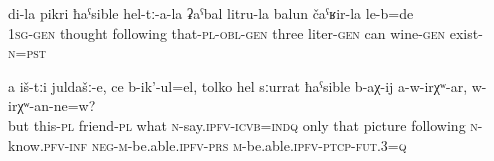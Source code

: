 \begin{exe}
	\ex
	\begin{xlist}
		\ex	\label{In my mind there was their 3-litre can with wine}
		\gll	di-la	pikri	ħaˁsible	hel-tː-a-la	ʡaˁbal	litru-la	balun	čaˁʁir-la le-b=de\\
			1\textsc{sg}-\textsc{gen}	thought	following	that-\textsc{pl}-\textsc{obl}-\textsc{gen}	three	liter-\textsc{gen} can	wine-\textsc{gen}	exist-\textsc{n}=\textsc{pst}\\
		\glt	{}

		\ex	\label{And these friends, what they are saying, only by means of the picture, (one) cannot know, can}
		\gll	a	iš-tːi	juldašː-e,	ce	b-ik'-ul=el,	tolko	hel	sːurrat	ħaˁsible	b-aχ-ij	a-w-irχʷ-ar,	w-irχʷ-an-ne=w?\\
			but	this-\textsc{pl}	friend-\textsc{pl}	what	\textsc{n}-say.\textsc{ipfv}-\textsc{icvb}=\textsc{indq}	only	that	picture	following	\textsc{n}-know.\textsc{pfv}-\textsc{inf}	\textsc{neg}-\textsc{m}-be.able.\textsc{ipfv}-\textsc{prs}	\textsc{m}-be.able.\textsc{ipfv}-\textsc{ptcp-fut.3=q}\\
		\glt	{}
	\end{xlist}
\end{exe}

